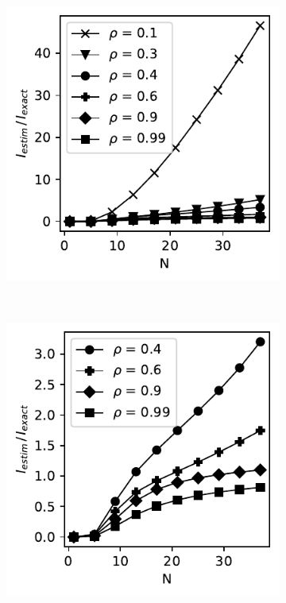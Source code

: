 \documentclass[../Thesis.tex]{subfiles}
\begin{document}
\begin{figure}[H]
    \centering
    \begin{subfigure}[t]{0.32\textwidth}
        \centering
        \includegraphics[width=\linewidth]{figures/ND examples/MI calc/gaussian example original all - B-spline.pdf}
        \caption{}
    \end{subfigure}%
    ~
    \begin{subfigure}[t]{0.32\textwidth}
        \centering
        \includegraphics[width=\linewidth]{figures/ND examples/MI calc/gaussian example original high corr - B-spline.pdf}

\end{subfigure}
\end{figure}
\end{document}

